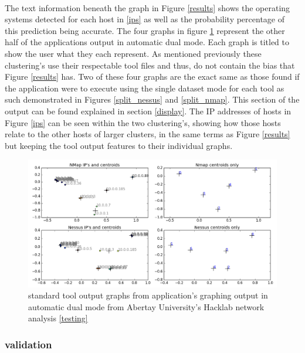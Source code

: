 \paragraph{}The text information beneath the graph in Figure \ref{results} shows the operating systems detected for each host in \ref{ips} as well as the probability percentage of this prediction being accurate. The four graphs in figure \ref{results2} represent the other half of the applications output in automatic dual mode. Each graph is titled to show the user what they each represent. As mentioned previously these clustering’s use their respectable tool files and thus, do not contain the bias that Figure \ref{results} has. Two of these four graphs are the exact same as those found if the application were to execute using the single dataset mode for each tool as such demonstrated in Figures \ref{split_nessus} and \ref{split_nmap}. This section of the output can be found explained in section \ref{display}. The IP addresses of hosts in Figure \ref{ips} can be seen within the two clustering’s, showing how those hosts relate to the other hosts of larger clusters, in the same terms as Figure \ref{results} but keeping the tool output features to their individual graphs.

\begin{figure}[!h]
\centering
\includegraphics[width=6in]{./Figures/results2.png}
\caption{standard tool output graphs from application’s graphing output in automatic dual mode from Abertay University’s Hacklab network analysis \ref{testing}}
\label{results2}
\end{figure}

\subsubsection{validation}


